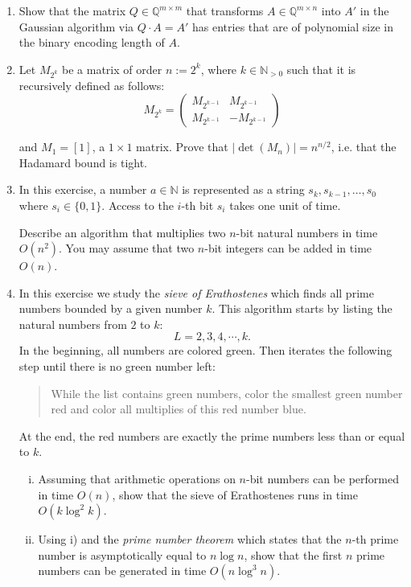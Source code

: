 \documentclass[11pt]{article}
\institute{\'Ecole Polytechnique F\'ed\'erale de Lausanne}
\newcommand{\setQ}{\mathbb{Q}}
\newcommand{\setN}{\mathbb{N}}
\begin{document}
\makeheader

\begin{enumerate}[1)]

\item Show that the matrix $Q\in\setQ^{m\times m}$ that transforms $A\in\setQ^{m\times n}$ into $A'$ in the Gaussian algorithm via $Q \cdot A = A'$ has entries that are of polynomial size in the binary encoding length of $A$.

\item Let $M_{2^k}$ be a matrix of order $n:= 2^k$, where $k∈\setN_{>0}$ such that it is recursively defined as follows:
$$M_{2^k} = \begin{pmatrix} M_{2^{k−1}} &  M_{2^{k−1}} \\ M_{2^{k−1}} & −M_{2^{k−1}} \end{pmatrix} $$

and $M_1 = [1]$, a $1 \times 1$ matrix. Prove that $|\det(M_n)|= n^{n/2}$, i.e. that the Hadamard bound is tight.




\item In this exercise, a number  $a ∈ ℕ$ is represented as a string $s_k,s_{k-1},\dots,s_0$ where $s_i ∈ \{0,1\}$. Access to the $i$-th bit $s_i$ takes one unit of time. 

Describe an algorithm that multiplies two $n$-bit natural numbers in time $O(n^2)$. You may assume that two $n$-bit integers can be added in time $O(n)$.  

\item In this exercise we study the \emph{sieve of Erathostenes} which finds all prime numbers bounded by a given number $k$. This algorithm starts by listing the natural numbers from $2$ to $k$: 
  \begin{displaymath}
    L = 2,3,4, \cdots, k. 
  \end{displaymath}
  In the beginning, all numbers are colored green.
  Then iterates the following step until there is no green number left:
  \begin{quote}    
    While the list contains green numbers, color the smallest green number red and color all multiplies of this red number blue.
  \end{quote}
  At the end, the red numbers are exactly the prime numbers less than or equal to $k$.

  \begin{enumerate}[i)] 
  \item Assuming that arithmetic operations on $n$-bit numbers can be performed in time $O(n)$, show that the sieve of Erathostenes runs in time $O(k \log^2 k)$.
  \item Using i) and the \emph{prime number theorem} which states that the $n$-th prime number is asymptotically equal to $n \log n$, show that the first $n$ prime numbers can be generated in time $O(n \log^3 n)$.
  \end{enumerate}


\end{enumerate}
\end{document}
